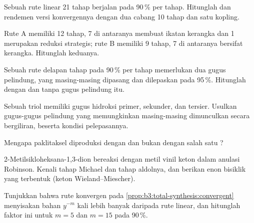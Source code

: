 \begin{exercise}[$\star\star$]\label{exo:b3:total-synthesis:5}
Sebuah rute linear 21 tahap berjalan pada 90\,\% per tahap. Hitunglah  dan rendemen
versi konvergennya dengan dua cabang 10 tahap dan satu kopling.
\end{exercise}

\begin{exercise}[$\star\star$]\label{exo:b3:total-synthesis:6}
Rute A memiliki 12 tahap, 7 di antaranya membuat ikatan kerangka dan 1 merupakan reduksi
strategis; rute B memiliki 9 tahap, 7 di antaranya bersifat kerangka. Hitunglah  keduanya.
\end{exercise}

\begin{exercise}[$\star\star$]\label{exo:b3:total-synthesis:7}
Sebuah rute delapan tahap pada 90\,\% per tahap memerlukan dua gugus pelindung, yang masing-masing dipasang dan
dilepaskan pada 95\,\%. Hitunglah  dengan dan tanpa gugus pelindung itu.
\end{exercise}

\begin{exercise}[$\star\star$]\label{exo:b3:total-synthesis:8}
Sebuah triol memiliki gugus hidroksi primer, sekunder, dan tersier. Usulkan
gugus-gugus pelindung yang memungkinkan masing-masing dimunculkan secara bergiliran, beserta kondisi
pelepasannya.
\end{exercise}

\begin{exercise}[$\star\star$]\label{exo:b3:total-synthesis:9}
Mengapa paklitaksel diproduksi dengan  dan bukan dengan salah satu ?
\end{exercise}

\begin{exercise}[$\star\star\star$]\label{exo:b3:total-synthesis:10}
2-Metilsikloheksana-1,3-dion bereaksi dengan metil vinil keton dalam anulasi
Robinson. Kenali tahap Michael dan tahap aldolnya, dan berikan enon bisiklik
yang terbentuk (keton Wieland--Miescher).
\end{exercise}

\begin{exercise}[$\star\star\star$]\label{exo:b3:total-synthesis:11}
Tunjukkan bahwa rute konvergen pada \cref{prop:b3:total-synthesis:convergent} menyisakan
bahan $y^{-m}$ kali lebih banyak daripada rute linear, dan hitunglah faktor ini untuk $m = 5$ dan
$m = 15$ pada 90\,\%.
\end{exercise}

